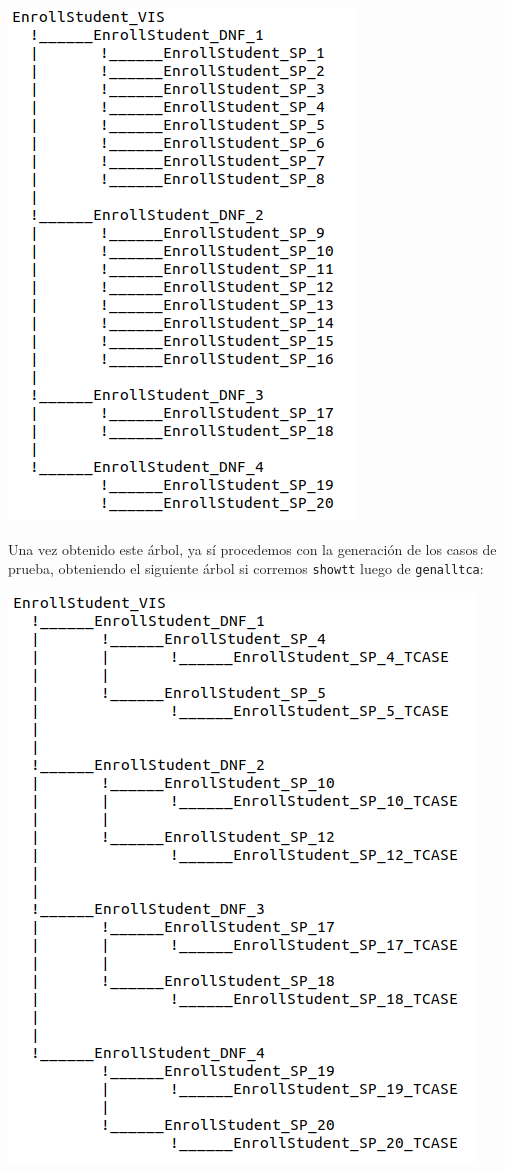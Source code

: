 \documentclass{article}
\begin{document}
\begin{center}
    \includegraphics[scale=0.5]{arboltt.png}
\end{center}

Una vez obtenido este árbol, ya sí procedemos con la generación de los casos de prueba, obteniendo el siguiente árbol si corremos \verb|showtt| luego de \verb|genalltca|:

\begin{center}
    \includegraphics[scale=0.5]{arboltca.png}
\end{center}
\end{document}
